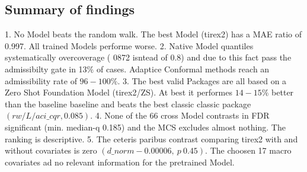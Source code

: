 \subsection{Summary of findings}
\label{sec:res:summary}
%
1. No Model beats the random walk. The best Model (tirex2) has a MAE ratio of 0.997. All trained Models performe worse.
2. Native Model quantiles systematically overcoverage ( 0872 isntead of 0.8) and due to this fact pass the admissibilty gate in 13$\%$ of cases. Adaptice Conformal methods reach an admissibility rate of $96-100\%$.
3. The best valid Packages are all based on a Zero Shot Foundation Model (tirex2/ZS). At best it performes $14-15\%$ better than the baseline baseline and beats the best classic classic package $(rw/L/aci\_cqr, 0.085)$.
4. None of the 66 cross Model contrasts in FDR significant (min. median-q 0.185) and the MCS excludes almost nothing. The ranking is descriptive.
5. The ceteris paribus contrast comparing tirex2 with and without covariates is zero $(d\_norm -0.00006,\ p \ 0.45)$. The choosen 17 macro covariates ad no relevant information for the pretrained Model.
